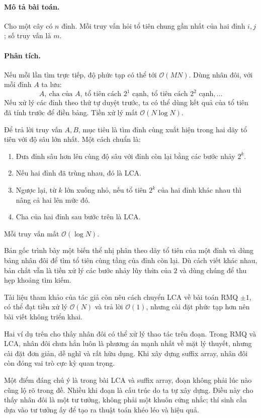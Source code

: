 \documentclass[11pt]{article}
\newcommand{\Oh}{\mathcal{O}}
\begin{document}
\paragraph{Mô tả bài toán.}
Cho một cây có $n$ đỉnh. Mỗi truy vấn hỏi tổ tiên chung gần nhất của hai đỉnh
$i,j$; số truy vấn là $m$.

\paragraph{Phân tích.}
Nếu mỗi lần tìm trực tiếp, độ phức tạp có thể tới $\Oh(MN)$. Dùng nhân đôi,
với mỗi đỉnh $A$ ta lưu:
\[
  A,\ \text{cha của }A,\ \text{tổ tiên cách }2^1\text{ cạnh},\
  \text{tổ tiên cách }2^2\text{ cạnh},\ldots
\]
Nếu xử lý các đỉnh theo thứ tự duyệt trước, ta có thể dùng kết quả của tổ tiên
đã tính trước để điền bảng. Tiền xử lý mất $\Oh(N\log N)$.

Để trả lời truy vấn $A,B$, mục tiêu là tìm đỉnh cùng xuất hiện trong hai dãy
tổ tiên với độ sâu lớn nhất. Một cách chuẩn là:
\begin{enumerate}
  \item Đưa đỉnh sâu hơn lên cùng độ sâu với đỉnh còn lại bằng các bước nhảy
  $2^k$.
  \item Nếu hai đỉnh đã trùng nhau, đó là LCA.
  \item Ngược lại, từ $k$ lớn xuống nhỏ, nếu tổ tiên $2^k$ của hai đỉnh khác
  nhau thì nâng cả hai lên mức đó.
  \item Cha của hai đỉnh sau bước trên là LCA.
\end{enumerate}
Mỗi truy vấn mất $\Oh(\log N)$.

Bản gốc trình bày một biến thể nhị phân theo dãy tổ tiên của một đỉnh và dùng
bảng nhân đôi để tìm tổ tiên cùng tầng của đỉnh còn lại. Dù cách viết khác
nhau, bản chất vẫn là tiền xử lý các bước nhảy lũy thừa của $2$ và dùng chúng
để thu hẹp khoảng tìm kiếm.

Tài liệu tham khảo của tác giả còn nêu cách chuyển LCA về bài toán RMQ
$\pm1$, có thể đạt tiền xử lý $\Oh(N)$ và trả lời $\Oh(1)$, nhưng cài đặt
phức tạp hơn nên bài viết không triển khai.

Hai ví dụ trên cho thấy nhân đôi có thể xử lý thao tác trên đoạn. Trong RMQ và
LCA, nhân đôi chưa hẳn luôn là phương án mạnh nhất về mặt lý thuyết, nhưng
cài đặt đơn giản, dễ nghĩ và rất hữu dụng. Khi xây dựng suffix array, nhân đôi
còn đóng vai trò cực kỳ quan trọng.

Một điểm đáng chú ý là trong bài LCA và suffix array, đoạn không phải lúc nào
cũng lộ rõ trong đề. Nhiều khi đoạn là cấu trúc do ta tự xây dựng. Điều này
cho thấy nhân đôi là một tư tưởng, không phải một khuôn cứng nhắc; thí sinh
cần dựa vào tư tưởng ấy để tạo ra thuật toán khéo léo và hiệu quả.
\end{document}
